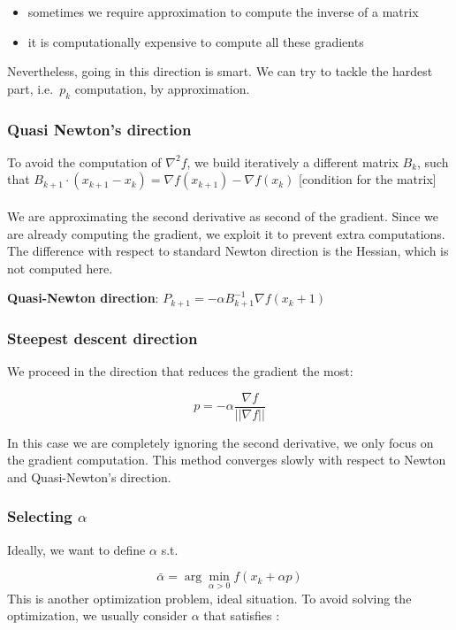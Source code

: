 \begin{itemize}
\tightlist
\item
  sometimes we require approximation to compute the inverse of a matrix
\item
  it is computationally expensive to compute all these gradients
\end{itemize}
\noindent
Nevertheless, going in this direction is smart. We can try to tackle the hardest part, i.e.~$p_k$ computation, by
approximation.


\subsubsection{Quasi Newton's direction}

To avoid the computation of $\nabla^2 f$, we build iteratively a
different matrix $B_k$, such that
$B_{k+1}\cdot (x_{k+1}-x_k) = \nabla f(x_{k+1})-\nabla f(x_k)$
{[}condition for the matrix{]}
\\
\\
\noindent
We are approximating the second derivative as second of the gradient.
Since we are already computing the gradient, we exploit it to prevent
extra computations. The difference with respect to standard Newton
direction is the Hessian, which is not computed here.

\textbf{Quasi-Newton direction}:
$P_{k+1}=- \alpha B_{k+1}^{-1} \nabla f(x_k+1)$


\subsubsection{Steepest descent direction}

We proceed in the direction that reduces the gradient the most:

$$
p= -\alpha \frac{\nabla f}{||\nabla f||}
$$

In this case we are completely ignoring the second derivative, we only
focus on the gradient computation. This method converges slowly with
respect to Newton and Quasi-Newton's direction.

\hypertarget{selecting-alpha}{%
\subsubsection{\texorpdfstring{Selecting
$\alpha$}{Selecting }}\label{selecting-alpha}}

Ideally, we want to define $\alpha$ s.t.

$$
\bar{\alpha}= \arg \min_{\alpha>0} f(x_k+\alpha p)
$$
\noindent
This is another optimization problem, ideal situation. To avoid solving
the optimization, we usually consider $\alpha$ that satisfies :

